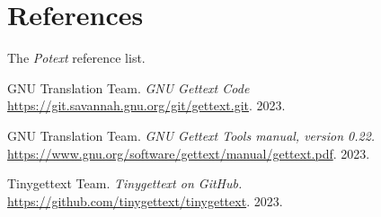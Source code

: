 %
%
%

\section{References}
\label{sec:references}

   The \textsl{Potext} reference list.

{\RaggedRight
\begin{thebibliography}{99}

   GNU Translation Team.
   \emph{GNU Gettext Code}
	\url{https://git.savannah.gnu.org/git/gettext.git}.
   2023.

   GNU Translation Team.
   \emph{GNU Gettext Tools manual, version 0.22.}
   \url{https://www.gnu.org/software/gettext/manual/gettext.pdf}.
   2023.

   Tinygettext Team.
   \emph{Tinygettext on GitHub.}
   \url{https://github.com/tinygettext/tinygettext}.
   2023.

\end{thebibliography}
}

